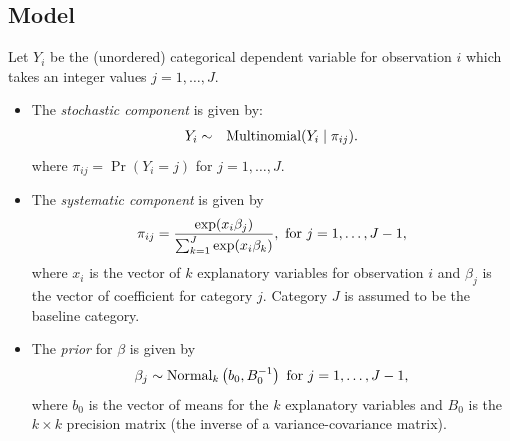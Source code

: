 \documentclass[letterpaper,10pt,english]{sphinxmanual}
\begin{document}
\subsection{Model}
\label{vignette:id77}
Let \(Y_{i}\) be the (unordered) categorical dependent variable for
observation \(i\) which takes an integer values
\(j=1, \ldots, J\).
\begin{itemize}
\item {} 
The \emph{stochastic component} is given by:
\begin{gather}
\begin{split}\begin{aligned}
Y_{i} &\sim& \textrm{Multinomial}(Y_i \mid \pi_{ij}).\end{aligned}\end{split}\notag
\end{gather}
where \(\pi_{ij}=\Pr(Y_i=j)\) for \(j=1, \ldots, J\).

\item {} 
The \emph{systematic component} is given by
\begin{gather}
\begin{split}\begin{aligned}
\pi_{ij}=\frac{\exp(x_i\beta_j)}{\sum_{k=1}^J \exp(x_i\beta_k)},
\textrm{ for } j=1,\ldots, J-1,\end{aligned}\end{split}\notag
\end{gather}
where \(x_{i}\) is the vector of \(k\) explanatory variables
for observation \(i\) and \(\beta_j\) is the vector of
coefficient for category \(j\). Category \(J\) is assumed to
be the baseline category.

\item {} 
The \emph{prior} for \(\beta\) is given by
\begin{gather}
\begin{split}\begin{aligned}
\beta_j \sim \textrm{Normal}_k\left(  b_{0},B_{0}^{-1}\right)
\textrm{ for } j = 1, \ldots, J-1,\end{aligned}\end{split}\notag
\end{gather}
where \(b_{0}\) is the vector of means for the \(k\)
explanatory variables and \(B_{0}\) is the \(k \times k\)
precision matrix (the inverse of a variance-covariance matrix).

\end{itemize}
\end{document}
